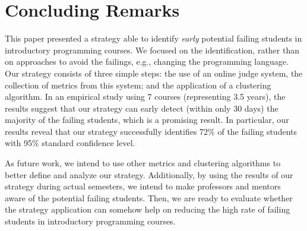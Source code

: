 \section{Concluding Remarks}

This paper presented a strategy able to identify \textit{early} potential failing students in introductory programming courses. We focused on the identification, rather than on approaches to avoid the failings, e.g., changing the programming language. Our strategy consists of three simple steps: the use of an online judge system, the collection of metrics from this system; and the application of a clustering algorithm. In an empirical study using 7 courses (representing 3.5 years), the results suggest that our strategy can early detect (within only 30 days) the majority of the failing students, which is a promising result. In particular, our results reveal that our strategy successfully identifies 72\% of the failing students with 95\% standard confidence level.

As future work, we intend to use other metrics and clustering algorithms to better define and analyze our strategy. Additionally, by using the results of our strategy during actual semesters, we intend to make professors and mentors aware of the potential failing students. Then, we are ready to evaluate whether the strategy application can somehow help on reducing the high rate of failing students in introductory programming courses.